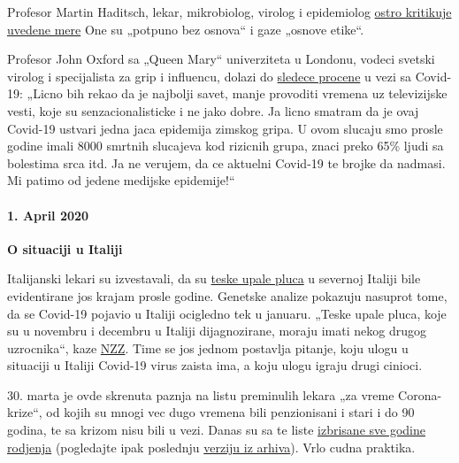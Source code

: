 Profesor Martin Haditsch, lekar, mikrobiolog, virolog i epidemiolog
\href{https://www.youtube.com/watch?v=PtzHH8DhgZM}{ostro kritikuje
uvedene mere} One su „potpuno bez osnova`` i gaze „osnove etike``.

Profesor John Oxford sa „Queen Mary`` univerziteta u Londonu, vodeci
svetski virolog i specijalista za grip i influencu, dolazi do
\href{https://novuscomms.com/2020/03/31/a-view-from-the-hvivo-open-orphan-orph-laboratory-professor-john-oxford/}{sledece
procene} u vezi sa Covid-19: „Licno bih rekao da je najbolji savet,
manje provoditi vremena uz televizijske vesti, koje su
senzacionalisticke i ne jako dobre. Ja licno smatram da je ovaj Covid-19
ustvari jedna jaca epidemija zimskog gripa. U ovom slucaju smo prosle
godine imali 8000 smrtnih slucajeva kod rizicnih grupa, znaci preko 65\%
ljudi sa bolestima srca itd. Ja ne verujem, da ce aktuelni Covid-19 te
brojke da nadmasi. Mi patimo od jedene medijske epidemije!``

\hypertarget{1-april-2020}{%
\paragraph{1. April 2020}\label{1-april-2020}}

\textbf{O situaciji u Italiji}

Italijanski lekari su izvestavali, da su
\href{https://www.scmp.com/news/china/society/article/3076334/coronavirus-strange-pneumonia-seen-lombardy-november-leading}{teske
upale pluca} u severnoj Italiji bile evidentirane jos krajam prosle
godine. Genetske analize pokazuju nasuprot tome, da se Covid-19 pojavio
u Italiji ocigledno tek u januaru. „Teske upale pluca, koje su u
novembru i decembru u Italiji dijagnozirane, moraju imati nekog drugog
uzrocnika``, kaze
\href{https://www.nzz.ch/wissenschaft/coronavirus-der-stammbaum-verraet-woher-es-kommt-ld.1548271}{NZZ}.
Time se jos jednom postavlja pitanje, koju ulogu u situaciji u Italiji
Covid-19 virus zaista ima, a koju ulogu igraju drugi cinioci.

30. marta je ovde skrenuta paznja na listu preminulih lekara „za vreme
Corona-krize``, od kojih su mnogi vec dugo vremena bili penzionisani i
stari i do 90 godina, te sa krizom nisu bili u vezi. Danas su sa te
liste
\href{https://portale.fnomceo.it/elenco-dei-medici-caduti-nel-corso-dellepidemia-di-covid-19/}{izbrisane
sve godine rodjenja} (pogledajte ipak poslednju
\href{https://web.archive.org/web/20200328152430/https://portale.fnomceo.it/elenco-dei-medici-caduti-nel-corso-dellepidemia-di-covid-19/}{verziju
iz arhiva}). Vrlo cudna praktika.

